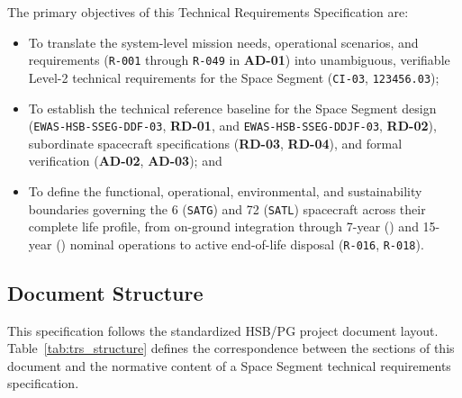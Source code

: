 The primary objectives of this Technical Requirements Specification are:
\begin{itemize}
    \item To translate the system-level mission needs, operational scenarios, and requirements (\texttt{R-001} through \texttt{R-049} in \textbf{AD-01}) into unambiguous, verifiable Level-2 technical requirements for the  Space Segment (\texttt{CI-03},  \texttt{123456.03});
    \item To establish the technical reference baseline for the Space Segment design (\texttt{EWAS-HSB-SSEG-DDF-03}, \textbf{RD-01}, and \texttt{EWAS-HSB-SSEG-DDJF-03}, \textbf{RD-02}), subordinate spacecraft specifications (\textbf{RD-03}, \textbf{RD-04}), and formal verification (\textbf{AD-02}, \textbf{AD-03}); and
    \item To define the functional, operational, environmental, and sustainability boundaries governing the 6  (\texttt{SATG}) and 72  (\texttt{SATL}) spacecraft across their complete life profile, from on-ground integration through 7-year () and 15-year () nominal operations to active end-of-life disposal (\texttt{R-016}, \texttt{R-018}).
\end{itemize}

\subsection{Document Structure}

This specification follows the standardized HSB/PG project document layout. Table~\ref{tab:trs_structure} defines the correspondence between the sections of this document and the normative content of a Space Segment technical requirements specification.

